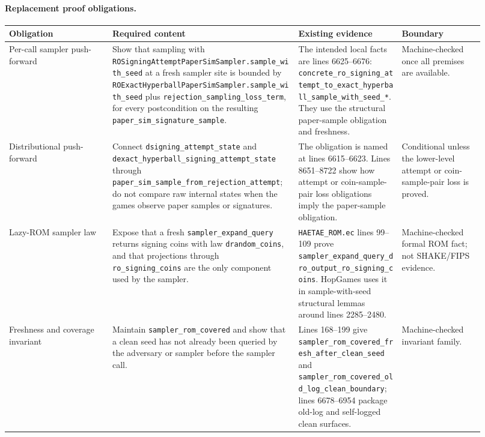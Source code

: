 \documentclass[11pt]{report}
\DeclareRobustCommand{\file}[1]{\ifmmode\text{\nolinkurl{#1}}\else\nolinkurl{#1}\fi}
\DeclareRobustCommand{\ec}[1]{\ifmmode\text{\nolinkurl{#1}}\else\nolinkurl{#1}\fi}
\theoremstyle{definition}
\theoremstyle{plain}
\begin{document}
\paragraph{Replacement proof obligations.}
{\scriptsize
\begin{longtable}{p{0.20\linewidth}p{0.36\linewidth}p{0.20\linewidth}p{0.16\linewidth}}
\toprule
\textbf{Obligation} & \textbf{Required content} & \textbf{Existing evidence} &
\textbf{Boundary} \\
\midrule
Per-call sampler push-forward &
Show that sampling with \ec{ROSigningAttemptPaperSimSampler.sample\_with\_seed}
at a fresh sampler site is bounded by
\ec{ROExactHyperballPaperSimSampler.sample\_with\_seed} plus
\ec{rejection\_sampling\_loss\_term}, for every postcondition on the resulting
\ec{paper\_sim\_signature\_sample}. &
The intended local facts are lines 6625--6676:
\ec{concrete\_ro\_signing\_attempt\_to\_exact\_hyperball\_sample\_with\_seed\_*}.
They use the structural paper-sample obligation and freshness. &
Machine-checked once all premises are available. \\
\midrule
Distributional push-forward &
Connect \ec{dsigning\_attempt\_state} and
\ec{dexact\_hyperball\_signing\_attempt\_state} through
\ec{paper\_sim\_sample\_from\_rejection\_attempt}; do not compare raw internal
states when the games observe paper samples or signatures. &
The obligation is named at lines 6615--6623.  Lines 8651--8722 show how attempt
or coin-sample-pair loss obligations imply the paper-sample obligation. &
Conditional unless the lower-level attempt or coin-sample-pair loss is proved. \\
\midrule
Lazy-ROM sampler law &
Expose that a fresh \ec{sampler\_expand\_query} returns signing coins with law
\ec{drandom\_coins}, and that projections through \ec{ro\_signing\_coins} are
the only component used by the sampler. &
\file{HAETAE\_ROM.ec} lines 99--109 prove
\ec{sampler\_expand\_query\_dro\_output\_ro\_signing\_coins}.  HopGames uses it
in sample-with-seed structural lemmas around lines 2285--2480. &
Machine-checked formal ROM fact; not SHAKE/FIPS evidence. \\
\midrule
Freshness and coverage invariant &
Maintain \ec{sampler\_rom\_covered} and show that a clean seed has not already
been queried by the adversary or sampler before the sampler call. &
Lines 168--199 give \ec{sampler\_rom\_covered\_fresh\_after\_clean\_seed} and
\ec{sampler\_rom\_covered\_old\_log\_clean\_boundary}; lines 6678--6954 package
old-log and self-logged clean surfaces. &
Machine-checked invariant family. \\

\end{longtable}}
\end{document}
